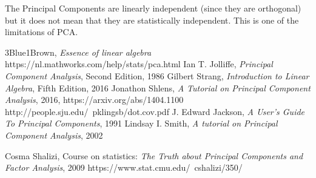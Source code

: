 \documentclass[10pt,twocolumn]{article}
\begin{document}




The Principal Components are linearly independent (since they are orthogonal) but it does not mean that they are statistically independent. This is one of the limitations of PCA.

\thebibliography{}

 3Blue1Brown, \textit{Essence of linear algebra}
 https://nl.mathworks.com/help/stats/pca.html
 Ian T. Jolliffe, \textit{Principal Component Analysis}, Second Edition, 1986
 Gilbert Strang, \textit{Introduction to Linear Algebra}, Fifth Edition, 2016
 Jonathon Shlens, \textit{A Tutorial on Principal Component Analysis}, 2016, https://arxiv.org/abs/1404.1100
 http://people.sju.edu/~pklingsb/dot.cov.pdf
 J. Edward Jackson, \textit{A User's Guide To Principal Components}, 1991
 Lindsay I. Smith, \textit{A tutorial on Principal Component Analysis}, 2002

 Cosma Shalizi, Course on statistics: \textit{The Truth about Principal Components and Factor Analysis}, 2009 https://www.stat.cmu.edu/~cshalizi/350/
\end{document}
